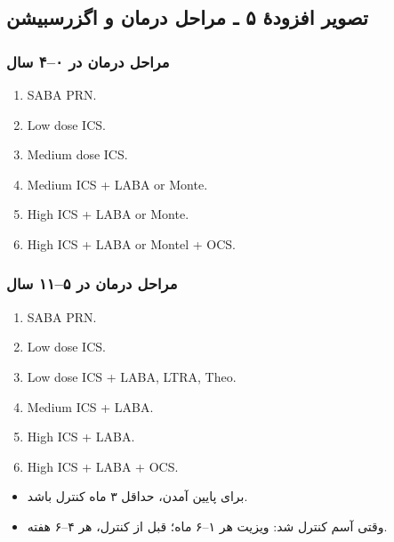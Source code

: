 \documentclass[11pt,a4paper]{article}
\begin{document}
\clearpage
\subsection*{تصویر افزودهٔ ۵ ـ مراحل درمان و اگزرسبیشن}
\subsubsection*{مراحل درمان در ۰–۴ سال}
\begin{latin}
\begin{enumerate}[label=Step \arabic*:]
  \item SABA PRN.
  \item Low dose ICS.
  \item Medium dose ICS.
  \item Medium ICS + LABA or Monte.
  \item High ICS + LABA or Monte.
  \item High ICS + LABA or Montel + OCS.
\end{enumerate}
\end{latin}

\subsubsection*{مراحل درمان در ۵–۱۱ سال}
\begin{latin}
\begin{enumerate}[label=Step \arabic*:]
  \item SABA PRN.
  \item Low dose ICS.
  \item Low dose ICS + LABA, LTRA, Theo.
  \item Medium ICS + LABA.
  \item High ICS + LABA.
  \item High ICS + LABA + OCS.
\end{enumerate}
\end{latin}

\begin{itemize}
  \item برای پایین آمدن، حداقل ۳ ماه کنترل باشد.
  \item وقتی آسم کنترل شد: ویزیت هر ۱–۶ ماه؛ قبل از کنترل، هر ۴–۶ هفته.
\end{itemize}
\end{document}

